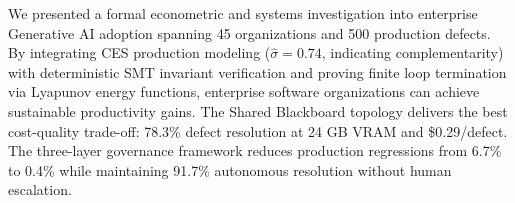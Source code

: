 \documentclass[10pt,twocolumn,letterpaper]{article}
\begin{document}
We presented a formal econometric and systems investigation into enterprise Generative AI adoption spanning 45 organizations and 500 production defects. By integrating CES production modeling ($\hat{\sigma} = 0.74$, indicating complementarity) with deterministic SMT invariant verification and proving finite loop termination via Lyapunov energy functions, enterprise software organizations can achieve sustainable productivity gains. The Shared Blackboard topology delivers the best cost-quality trade-off: 78.3\% defect resolution at 24 GB VRAM and \$0.29/defect. The three-layer governance framework reduces production regressions from 6.7\% to 0.4\% while maintaining 91.7\% autonomous resolution without human escalation. \cite{crossref_10_2139_ssrn_6374778}


\par\vspace{0.5em}



\end{document}
